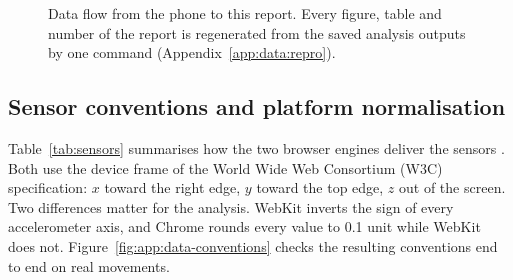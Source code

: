 \begin{figure}[htbp]
\centering
{}
\caption{Data flow from the phone to this report. Every figure, table and number of the report is regenerated
from the saved analysis outputs by one command (Appendix~\ref{app:data:repro}).}\label{fig:system}
\end{figure}

\subsection{Sensor conventions and platform normalisation}\label{app:data:conventions}

Table~\ref{tab:sensors} summarises how the two browser engines deliver the sensors
\cite{w3c2025deviceorientation}. Both use the device frame of the World Wide Web Consortium (W3C) specification: $x$ toward the right edge,
$y$ toward the top edge, $z$ out of the screen. Two differences matter for the analysis. WebKit inverts the
sign of every accelerometer axis, and Chrome rounds every value to 0.1 unit while WebKit does not.
Figure~\ref{fig:app:data-conventions} checks the resulting conventions end to end on real movements.

